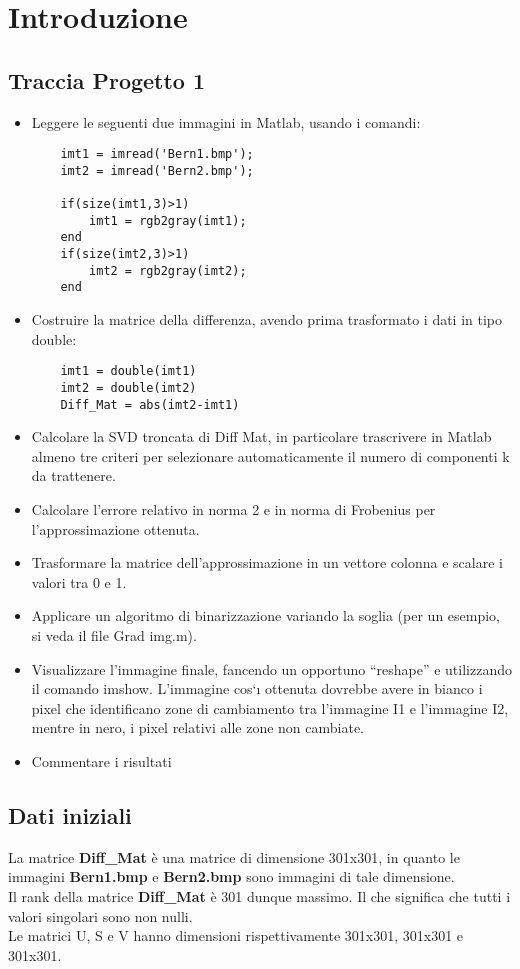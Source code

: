\section{Introduzione}
\subsection{Traccia Progetto 1}
\begin{itemize}
    \item 

Leggere le seguenti due immagini in Matlab, usando i comandi:

\begin{verbatim}
    imt1 = imread('Bern1.bmp');
    imt2 = imread('Bern2.bmp');
    
    if(size(imt1,3)>1)
        imt1 = rgb2gray(imt1);
    end
    if(size(imt2,3)>1)
        imt2 = rgb2gray(imt2);
    end
\end{verbatim}

 \item Costruire la matrice della differenza, avendo prima trasformato i dati in tipo double:
 \begin{verbatim}
    imt1 = double(imt1)
    imt2 = double(imt2)
    Diff_Mat = abs(imt2-imt1)    
 \end{verbatim}

 
 \item Calcolare la SVD troncata di Diff
 Mat, in particolare trascrivere in Matlab almeno tre criteri
 per selezionare automaticamente il numero di componenti k da trattenere.
 \item Calcolare l’errore relativo in norma 2 e in norma di Frobenius per l’approssimazione ottenuta.
 \item Trasformare la matrice dell’approssimazione in un vettore colonna e scalare i valori tra 0 e 1.
 \item Applicare un algoritmo di binarizzazione variando la soglia (per un esempio, si veda il file
 Grad img.m).
 \item Visualizzare l’immagine finale, fancendo un opportuno “reshape” e utilizzando il comando imshow.
 L’immagine cos`ı ottenuta dovrebbe avere in bianco i pixel che identificano zone di cambiamento
 tra l’immagine I1 e l’immagine I2, mentre in nero, i pixel relativi alle zone non cambiate.
 \item Commentare i risultati

\end{itemize}

\subsection{Dati iniziali}
La matrice \textbf{Diff\_Mat} è una matrice di dimensione 301x301, in quanto le immagini \textbf{Bern1.bmp} e \textbf{Bern2.bmp} sono immagini di tale dimensione.\\
Il rank della matrice \textbf{Diff\_Mat} è 301 dunque massimo. Il che significa che tutti i valori singolari sono non nulli.\\
Le matrici U, S e V hanno dimensioni rispettivamente 301x301, 301x301 e 301x301.\\